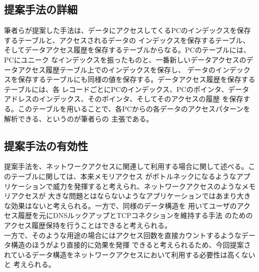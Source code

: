 \documentclass[10pt,a4paper]{ltjsarticle}       %
\begin{document}
\subsection{提案手法の詳細}
筆者らが提案した手法は、データにアクセスしてくるPCのインデックスを保存するテーブルと、アクセスされるデータの
インデックスを保存するテーブル、そしてデータアクセス履歴を保存するテーブルからなる。PCのテーブルには、PCにユニーク
なインデックスを振ったものと、一番新しいデータアクセスのデータアクセス履歴テーブル上でのインデックスを保存し、
データのインデックスを保存するテーブルにも同様の値を保存する。データアクセス履歴を保存するテーブルには、各
レコードごとにPCのインデックス、PCのポインタ、データアドレスのインデックス、そのポインタ、そしてそのアクセスの履歴
を保存する。このテーブルを用いることで、各PCからの各データのアクセスパターンを解析できる、というのが筆者らの
主張である。
\subsection{提案手法の有効性}
提案手法を、ネットワークアクセスに関連して利用する場合に関して述べる。このテーブルに関しては、本来メモリアクセス
がボトルネックになるようなアプリケーションで威力を発揮すると考えられ、ネットワークアクセスのようなメモリアクセスが
大きな問題とはならないようなアプリケーションではあまり大きな効果はないと考えられる。一方で、同様のデータ構造を
用いてユーザのアクセス履歴を元にDNSルックアップとTCPコネクションを維持する手法
\cite{sundaresan2012accelerating}のためのアクセス履歴保持を行うことはできると考えられる。\\

一方で、そのような用途の場合にはアクセス回数を直接カウントするようなデータ構造のほうがより直接的に効果を発揮
できると考えられるため、今回提案されているデータ構造をネットワークアクセスにおいて利用する必要性は高くないと
考えられる。


\end{document}
